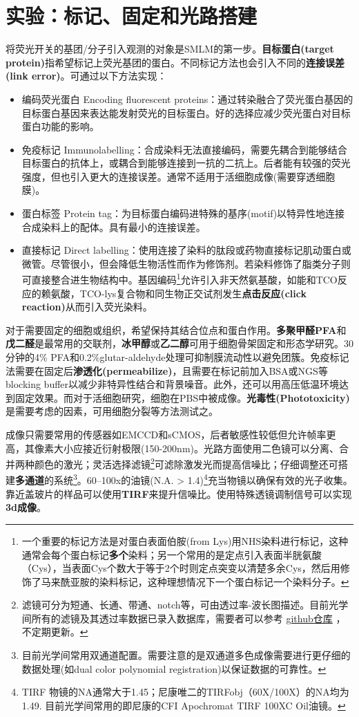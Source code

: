 \documentclass[12pt]{ctexart}
\begin{document}
\section*{实验：标记、固定和光路搭建}
将荧光开关的基团/分子引入观测的对象是SMLM的第一步。\textbf{目标蛋白(target protein)}指希望标记上荧光基团的蛋白。不同标记方法也会引入不同的\textbf{连接误差(link error)}。可通过以下方法实现：
\begin{itemize}
    \item 编码荧光蛋白 Encoding fluorescent proteins：通过转染融合了荧光蛋白基因的目标蛋白基因来表达能发射荧光的目标蛋白。好的选择应减少荧光蛋白对目标蛋白功能的影响。
    \item 免疫标记 Immunolabelling：合成染料无法直接编码，需要先耦合到能够结合目标蛋白的抗体上，或耦合到能够连接到一抗的二抗上。后者能有较强的荧光强度，但也引入更大的连接误差。通常不适用于活细胞成像(需要穿透细胞膜)。
    \item 蛋白标签 Protein tag：为目标蛋白编码进特殊的基序(motif)以特异性地连接合成染料上的配体。具有最小的连接误差。
    \item 直接标记 Direct labelling：使用连接了染料的肽段或药物直接标记肌动蛋白或微管。尽管很小，但会降低生物活性而作为修饰剂。若染料修饰了脂类分子则可直接整合进生物结构中。基因编码\footnote{一个重要的标记方法是对蛋白表面伯胺(from Lys)用NHS染料进行标记，这种通常会每个蛋白标记\textbf{多个}染料；另一个常用的是定点引入表面半胱氨酸（Cys），当表面Cys个数大于等于2个时则定点突变以清楚多余Cys，然后用修饰了马来酰亚胺的染料标记，这种理想情况下一个蛋白标记一个染料分子。}允许引入非天然氨基酸，如能和TCO反应的赖氨酸，TCO-lys复合物和同生物正交试剂发生\textbf{点击反应(click reaction)}从而引入荧光染料。
\end{itemize}
\par 对于需要固定的细胞或组织，希望保持其结合位点和蛋白作用。\textbf{多聚甲醛PFA}和\textbf{戊二醛}是最常用的交联剂，\textbf{冰甲醇}或\textbf{乙二醇}可用于细胞骨架固定和形态学研究。30分钟的4\% PFA和0.2\%glutar-aldehyde处理可抑制膜流动性以避免团簇。免疫标记法需要在固定后\textbf{渗透化(permeabilize)}，且需要在标记前加入BSA或NGS等blocking buffer以减少非特异性结合和背景噪音。此外，还可以用高压低温环境达到固定效果。而对于活细胞研究，细胞在PBS中被成像。\textbf{光毒性(Phototoxicity)}是需要考虑的因素，可用细胞分裂等方法测试之。
\par 成像只需要常用的传感器如EMCCD和sCMOS，后者敏感性较低但允许帧率更高，其像素大小应接近衍射极限(150-200nm)。光路方面使用二色镜可以分离、合并两种颜色的激光；灵活选择滤镜\footnote{滤镜可分为短通、长通、带通、notch等，可由透过率-波长图描述。目前光学间所有的滤镜及其透过率数据已录入数据库，需要者可以参考 \href{https://github.com/Jerry-LXH/FudanChemNotes/tree/main/SmilE/Optics_exp/Database_of_filters}{github仓库} ，不定期更新。}可滤除激发光而提高信噪比；仔细调整还可搭建\textbf{多通道}的系统\footnote{目前光学间常用双通道配置。需要注意的是双通道多色成像需要进行更仔细的数据处理(如dual color polynomial registration)以保证数据的可靠性。}。60–100x的油镜(N.A. > 1.4)\footnote{TIRF 物镜的NA通常大于1.45；尼康唯二的TIRFobj（60X/100X）的NA均为1.49. 目前光学间常用的即尼康的CFI Apochromat TIRF 100XC Oil油镜。}充当物镜以确保有效的光子收集。靠近盖玻片的样品可以使用\textbf{TIRF}来提升信噪比。使用特殊透镜调制信号可以实现\textbf{3d成像}。
\end{document}

